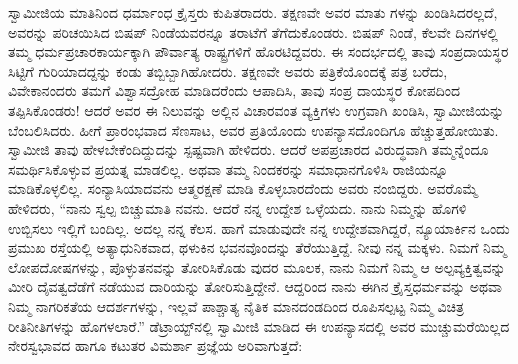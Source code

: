ಸ್ವಾಮೀಜಿಯ ಮಾತಿನಿಂದ ಧರ್ಮಾಂಧ ಕ್ರೈಸ್ತರು ಕುಪಿತರಾದರು. ತಕ್ಷಣವೇ ಅವರ ಮಾತು ಗಳನ್ನು ಖಂಡಿಸಿದರಲ್ಲದೆ, ಅವರನ್ನು ಪರಿಚಯಿಸಿದ ಬಿಷಪ್ ನಿಂಡೆಯವರನ್ನೂ ತರಾಟೆಗೆ ತೆಗೆದುಕೊಂಡರು. ಬಿಷಪ್ ನಿಂಡೆ, ಕೆಲವೇ ದಿನಗಳಲ್ಲಿ ತಮ್ಮ ಧರ್ಮಪ್ರಚಾರಕಾರ್ಯಕ್ಕಾಗಿ ಪೌರ್ವಾತ್ಯ ರಾಷ್ಟ್ರಗಳಿಗೆ ಹೊರಟಿದ್ದವರು. ಈ ಸಂದರ್ಭದಲ್ಲಿ ತಾವು ಸಂಪ್ರದಾಯಸ್ಥರ ಸಿಟ್ಟಿಗೆ ಗುರಿಯಾದದ್ದನ್ನು ಕಂಡು ತಬ್ಬಿಬ್ಬಾಗಿಹೋದರು. ತಕ್ಷಣವೇ ಅವರು ಪತ್ರಿಕೆಯೊಂದಕ್ಕೆ ಪತ್ರ ಬರೆದು, ವಿವೇಕಾನಂದರು ತಮಗೆ ವಿಶ್ವಾಸದ್ರೋಹ ಮಾಡಿದರೆಂದು ಆಪಾದಿಸಿ, ತಾವು ಸಂಪ್ರ ದಾಯಸ್ಥರ ಕೋಪದಿಂದ ತಪ್ಪಿಸಿಕೊಂಡರು! ಆದರೆ ಅವರ ಈ ನಿಲುವನ್ನು ಅಲ್ಲಿನ ವಿಚಾರವಂತ ವ್ಯಕ್ತಿಗಳು ಉಗ್ರವಾಗಿ ಖಂಡಿಸಿ, ಸ್ವಾಮೀಜಿಯನ್ನು ಬೆಂಬಲಿಸಿದರು. ಹೀಗೆ ಪ್ರಾರಂಭವಾದ ಸೆಣಸಾಟ, ಅವರ ಪ್ರತಿಯೊಂದು ಉಪನ್ಯಾಸದೊಂದಿಗೂ ಹೆಚ್ಚುತ್ತಹೋಯಿತು. ಸ್ವಾಮೀಜಿ ತಾವು ಹೇಳಬೇಕೆಂದಿದ್ದುದನ್ನು ಸ್ಪಷ್ಟವಾಗಿ ಹೇಳಿದರು. ಆದರೆ ಅಪಪ್ರಚಾರದ ವಿರುದ್ಧವಾಗಿ ತಮ್ಮನ್ನೆಂದೂ ಸಮರ್ಥಿಸಿಕೊಳ್ಳುವ ಪ್ರಯತ್ನ ಮಾಡಲಿಲ್ಲ. ಅಥವಾ ತಮ್ಮ ನಿಂದಕರನ್ನು ಸಮಾಧಾನಗೊಳಿಸಿ ರಾಜಿಯನ್ನೂ ಮಾಡಿಕೊಳ್ಳಲಿಲ್ಲ. ಸಂನ್ಯಾಸಿಯಾದವನು ಆತ್ಮರಕ್ಷಣೆ ಮಾಡಿ ಕೊಳ್ಳಬಾರದೆಂದು ಅವರು ನಂಬಿದ್ದರು. ಅವರೊಮ್ಮೆ ಹೇಳಿದರು, “ನಾನು ಸ್ವಲ್ಪ ಬಿಚ್ಚುಮಾತಿ ನವನು. ಆದರೆ ನನ್ನ ಉದ್ದೇಶ ಒಳ್ಳೆಯದು. ನಾನು ನಿಮ್ಮನ್ನು ಹೊಗಳಿ ಉಬ್ಬಿಸಲು ಇಲ್ಲಿಗೆ ಬಂದಿಲ್ಲ. ಅದಲ್ಲ ನನ್ನ ಕೆಲಸ. ಹಾಗೆ ಮಾಡುವುದೇ ನನ್ನ ಉದ್ದೇಶವಾಗಿದ್ದರೆ, ನ್ಯೂಯಾರ್ಕಿನ ಒಂದು ಪ್ರಮುಖ ರಸ್ತೆಯಲ್ಲಿ ಅತ್ಯಾಧುನಿಕವಾದ, ಥಳುಕಿನ ಭವನವೊಂದನ್ನು ತೆರೆಯುತ್ತಿದ್ದೆ. ನೀವು ನನ್ನ ಮಕ್ಕಳು. ನಿಮಗೆ ನಿಮ್ಮ ಲೋಪದೋಷಗಳನ್ನು, ಪೊಳ್ಳುತನವನ್ನು ತೋರಿಸಿಕೊಡು ವುದರ ಮೂಲಕ, ನಾನು ನಿಮಗೆ ನಿಮ್ಮ ಆ ಅಲ್ಪವ್ಯಕ್ತಿತ್ವವನ್ನು ಮೀರಿ ದೈವತ್ವದೆಡೆಗೆ ನಡೆಯುವ ದಾರಿಯನ್ನು ತೋರಿಸುತ್ತಿದ್ದೇನೆ. ಆದ್ದರಿಂದ ನಾನು ಈಗಿನ ಕ್ರೈಸ್ತಧರ್ಮವನ್ನು ಅಥವಾ ನಿಮ್ಮ ನಾಗರಿಕತೆಯ ಆದರ್ಶಗಳನ್ನು, ಇಲ್ಲವೆ ಪಾಶ್ಚಾತ್ಯ ನೈತಿಕ ಮಾನದಂಡದಿಂದ ರೂಪಿಸಲ್ಪಟ್ಟ ನಿಮ್ಮ ವಿಚಿತ್ರ ರೀತಿನೀತಿಗಳನ್ನು ಹೊಗಳಲಾರೆ.” ಡೆಟ್ರಾಯ್ಟ್​ನಲ್ಲಿ ಸ್ವಾಮೀಜಿ ಮಾಡಿದ ಈ ಉಪನ್ಯಾಸದಲ್ಲಿ ಅವರ ಮುಚ್ಚುಮರೆಯಿಲ್ಲದ ನೇರಸ್ವಭಾವದ ಹಾಗೂ ಕಟುತರ ವಿಮರ್ಶಾ ಪ್ರಜ್ಞೆಯ ಅರಿವಾಗುತ್ತದೆ:

